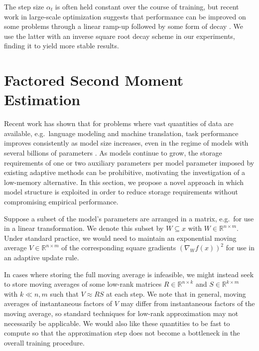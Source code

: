 \documentclass{article}
\begin{document}
The step size $\alpha_t$ is often held constant over the course of training, but recent work in large-scale optimization suggests that performance can be improved on some problems through a linear ramp-up followed by some form of decay \cite{Goyal17Accurate,Vaswani17Attention}. We use the latter with an inverse square root decay scheme in our experiments, finding it to yield more stable results.




\section{Factored Second Moment Estimation}
\label{sec:fsme}

Recent work has shown that for problems where vast quantities of data are available, e.g.\ language modeling and machine translation, task performance improves consistently as model size increases, even in the regime of models with several billions of parameters \cite{Shazeer17Outrageously}. As models continue to grow, the storage requirements of one or two auxiliary parameters per model parameter imposed by existing adaptive methods can be prohibitive, motivating the investigation of a low-memory alternative. In this section, we propose a novel approach in which model structure is exploited in order to reduce storage requirements without compromising empirical performance.

Suppose a subset of the model's parameters are arranged in a matrix, e.g.\ for use in a linear transformation. We denote this subset by $W \subseteq x$ with $W \in \mathbb{R}^{n \times m}$. Under standard practice, we would need to maintain an exponential moving average $V \in \mathbb{R}^{n \times m}$ of the corresponding square gradients $(\nabla_W f(x))^2$ for use in an adaptive update rule.

In cases where storing the full moving average is infeasible, we might instead seek to store moving averages of some low-rank matrices $R \in \mathbb{R}^{n \times k}$ and $S \in \mathbb{R}^{k \times m}$ with $k \ll n, m$ such that $V \approx R S$ at each step. We note that in general, moving averages of instantaneous factors of $V$ may differ from instantaneous factors of the moving average, so standard techniques for low-rank approximation may not necessarily be applicable. We would also like these quantities to be fast to compute so that the approximation step does not become a bottleneck in the overall training procedure.
\end{document}
